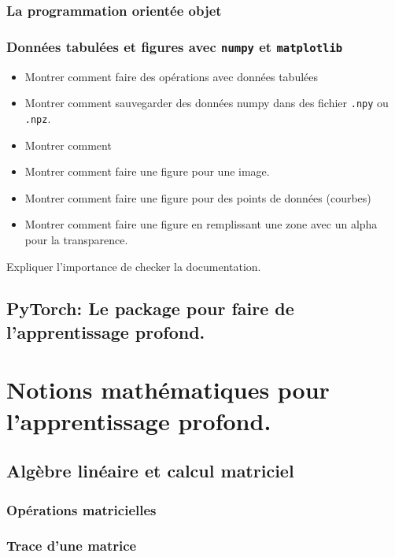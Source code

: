 \documentclass[titlepage]{article}
\theoremstyle{cleanremark}
\begin{document}
\subsubsection{La programmation orientée objet}

\subsubsection{Données tabulées et figures avec \texttt{numpy} et \texttt{matplotlib}}

\begin{itemize}
    \item Montrer comment faire des opérations avec données tabulées
    \item Montrer comment sauvegarder des données numpy dans des fichier \texttt{.npy} ou \texttt{.npz}. 
    \item Montrer comment 
    \item Montrer comment faire une figure pour une image. 
    \item Montrer comment faire une figure pour des points de données (courbes)
    \item Montrer comment faire une figure en remplissant une zone avec un alpha pour la transparence. 
\end{itemize}

Expliquer l'importance de checker la documentation. 

\subsection{PyTorch: Le package pour faire de l'apprentissage profond.}

\section{Notions mathématiques pour l'apprentissage profond.}

\subsection{Algèbre linéaire et calcul matriciel}
\subsubsection{Opérations matricielles}

\subsubsection{Trace d'une matrice}
\end{document}
